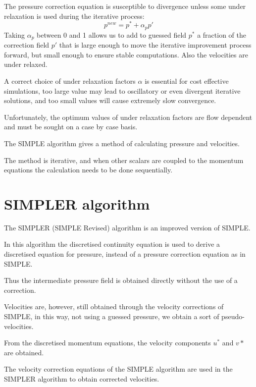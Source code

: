 \documentclass[a4paper, 15pt]{article}
\begin{document}
The
pressure correction equation is susceptible to divergence unless some under relaxation is
used during the iterative process:
\[p^{new} = p^* + \alpha_pp'\]
Taking
$\alpha_p$ between 0 and 1 allows us to add to guessed field $p^*$ a fraction of the correction field
$p'$ that is large enough to move the iterative improvement process forward, but small enough to
ensure stable computations. Also the
velocities are under relaxed. \newline 

A
correct choice of under relaxation factors $\alpha$ is essential for cost effective simulations, too
large value may lead to oscillatory or even divergent iterative solutions, and too small values will cause extremely slow convergence. 

Unfortunately,
the optimum values of under relaxation factors are flow dependent and must be
sought on a case by case basis. \newline 

The
SIMPLE algorithm gives a method of calculating
pressure and velocities. 

The
method is iterative, and when other scalars are
coupled to the momentum equations the calculation
needs to be done sequentially.

\section{SIMPLER algorithm}

The
SIMPLER (SIMPLE Revised) algorithm is an improved version of SIMPLE. \newline 

In
this algorithm the discretised continuity equation is used to derive a discretised equation for
pressure, instead of a pressure correction equation as in SIMPLE. 

Thus
the intermediate pressure field is obtained directly without the use of a correction. 

Velocities
are, however, still obtained through the velocity corrections of SIMPLE, in this way, not using a guessed pressure, we obtain a sort of pseudo-velocities.   \newline 


From
the discretised momentum equations, the
velocity components $u^*$ and $v*$ are obtained. \newline 

The
velocity correction equations of the SIMPLE
algorithm are used in the SIMPLER algorithm to
obtain corrected velocities. 
\end{document}
